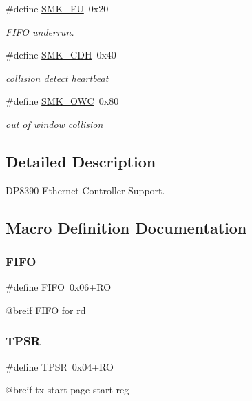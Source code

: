 \begin{DoxyCompactItemize}
\mbox{\label{group__gumstix__dp8390_gac1a04d4dcec40a9d4b8f3cdb6eba78f7}} 
\#define \mbox{\hyperlink{group__gumstix__dp8390_gac1a04d4dcec40a9d4b8f3cdb6eba78f7}{S\+M\+K\+\_\+\+FU}}~0x20
\begin{DoxyCompactList}\small\item\em F\+I\+FO underrun. \end{DoxyCompactList}\item 
\mbox{\label{group__gumstix__dp8390_ga03be43a7f5646a670513d05cfadad779}} 
\#define \mbox{\hyperlink{group__gumstix__dp8390_ga03be43a7f5646a670513d05cfadad779}{S\+M\+K\+\_\+\+C\+DH}}~0x40
\begin{DoxyCompactList}\small\item\em collision detect heartbeat \end{DoxyCompactList}\item 
\mbox{\label{group__gumstix__dp8390_gad3a606b7359835f7fe8a8e52bbb8432a}} 
\#define \mbox{\hyperlink{group__gumstix__dp8390_gad3a606b7359835f7fe8a8e52bbb8432a}{S\+M\+K\+\_\+\+O\+WC}}~0x80
\begin{DoxyCompactList}\small\item\em out of window collision \end{DoxyCompactList}\end{DoxyCompactItemize}


\subsection{Detailed Description}
D\+P8390 Ethernet Controller Support. 



\subsection{Macro Definition Documentation}
\mbox{\label{group__gumstix__dp8390_gaf6bc2702f6a1a4bb063b0726d90999da}} 
\subsubsection{\texorpdfstring{FIFO}{FIFO}}
{\footnotesize\ttfamily \#define F\+I\+FO~0x06+\+RO}

@breif F\+I\+FO for rd \mbox{\label{group__gumstix__dp8390_ga3598f69a63ca54d51568ca922c465bcb}} 
\subsubsection{\texorpdfstring{TPSR}{TPSR}}
{\footnotesize\ttfamily \#define T\+P\+SR~0x04+\+RO}

@breif tx start page start reg 